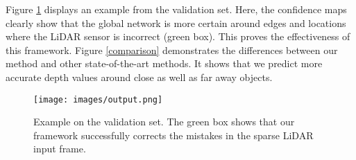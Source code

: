 \documentclass{main_style}
\begin{document}
Figure \ref{example} displays an example from the validation set. Here, the confidence maps clearly show that the global network is more certain around edges and locations where the LiDAR sensor is incorrect (green box). This proves the effectiveness of this framework. Figure \ref{comparison} demonstrates the differences between our method and other state-of-the-art methods. It shows that we predict more accurate depth values around close as well as far away objects.

\begin{figure}[H]
\noindent
  \begin{center}
    \texttt{[image: images/output.png]}
  \end{center}
  \caption{
    Example on the validation set. The green box shows that our framework successfully corrects the mistakes in the sparse LiDAR input frame.
  }
  \label{example}
\end{figure}
\balance
\end{document}
